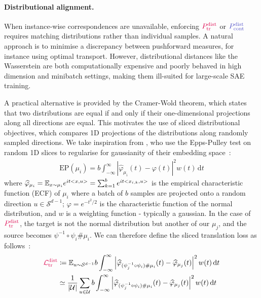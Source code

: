 \documentclass{article}
\begin{document}
\paragraph{Distributional alignment.}
When instance-wise correspondences are unavailable, enforcing $\Ptrdist$ or $\Pcontdist$ requires matching distributions rather than individual samples. A natural approach is to minimise a discrepancy between pushforward measures, for instance using optimal transport. However, distributional distances like the Wasserstein are both computationally expensive and poorly behaved in high dimension and minibatch settings, making them ill-suited for large-scale SAE training.

A practical alternative is provided by the Cramer-Wold theorem, which states that two distributions are equal if and only if their one-dimensional projections along all directions are equal. This motivates the use of sliced distributional objectives, which compares 1D projections of the distributions along randomly sampled directions. We take inspiration from \citet{TODO:LeJEPA}, who use the Epps-Pulley test on random 1D slices to regularise for gaussianity of their embedding space~:
%
\begin{align}
\label{eq:sliced_EP}
\mathrm{EP}(\mu_i) = b \int_{-\infty}^{\infty} \left|\widehat{\varphi}_{\mu_i}(t) - \varphi(t)\right|^2 w(t)\,\mathrm{d}t
\end{align}
%
where $\widehat{\varphi}_{\mu_i} = \mathbb{E}_{x \sim \mu_i} e^{it<x, u>} = \sum_{k=1}^b e^{it<x_{i, k}, u>}$ is the empirical characteristic function (ECF) of $\mu_i$ where a batch of $b$ samples are projected onto a random direction $u \in \mathcal{S}^{d-1}$; $\varphi = e^{-t^2/2}$ is the characteristic function of the normal distribution, and $w$ is a weighting function - typically a gaussian. In the case of $\Ptrdist$, the target is not the normal distribution but another of our $\mu_j$, and the source becomes $\psi^{-1} \circ \psi_i \# \mu_i$. We can therefore define the sliced translation loss as follows~:
%
\begin{align}
\label{eq:sliced_translation_loss}
\Ltrdist
&\coloneqq \E_{u \sim \mathcal{S}^{d-1}} b \int_{-\infty}^{\infty} \left|\widehat{\varphi}_{(\psi^{-1}_j \circ \psi_i) \# \mu_i}(t) - \widehat{\varphi}_{\mu_j}(t)\right|^2 w(t)\,\mathrm{d}t\\
&\simeq \frac{1}{|\mathcal{U}|} \sum_{u \in \mathcal{U}} b \int_{-\infty}^{\infty} \left|\widehat{\varphi}_{(\psi^{-1}_j \circ \psi_i) \# \mu_i}(t) - \widehat{\varphi}_{\mu_j}(t)\right|^2 w(t)\,\mathrm{d}t
\end{align}
\end{document}
